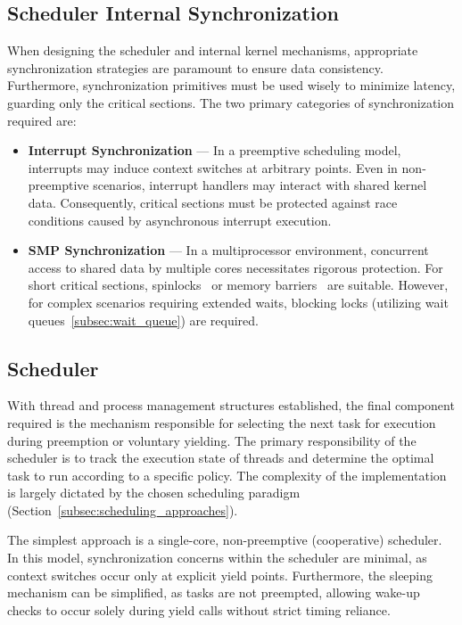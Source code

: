 \documentclass[a4paper,10pt,twoside]{report}
\theoremstyle{definition}
\begin{document}
\subsection{Scheduler Internal Synchronization}

When designing the scheduler and internal kernel mechanisms, appropriate synchronization strategies are paramount to ensure data consistency. Furthermore, synchronization primitives must be used wisely to minimize latency, guarding only the critical sections. The two primary categories of synchronization required are:

\begin{itemize}
\item \textbf{Interrupt Synchronization} --- In a preemptive scheduling model, interrupts may induce context switches at arbitrary points. Even in non-preemptive scenarios, interrupt handlers may interact with shared kernel data. Consequently, critical sections must be protected against race conditions caused by asynchronous interrupt execution.
\item \textbf{SMP Synchronization} --- In a multiprocessor environment, concurrent access to shared data by multiple cores necessitates rigorous protection. For short critical sections, spinlocks~\cite{spinlock} or memory barriers~\cite{barriers} are suitable. However, for complex scenarios requiring extended waits, blocking locks (utilizing wait queues~\ref{subsec:wait_queue}) are required.
\end{itemize}

\subsection{Scheduler}

With thread and process management structures established, the final component required is the mechanism responsible for selecting the next task for execution during preemption or voluntary yielding. The primary responsibility of the scheduler is to track the execution state of threads and determine the optimal task to run according to a specific policy. The complexity of the implementation is largely dictated by the chosen scheduling paradigm (Section~\ref{subsec:scheduling_approaches}).

The simplest approach is a single-core, non-preemptive (cooperative) scheduler. In this model, synchronization concerns within the scheduler are minimal, as context switches occur only at explicit yield points. Furthermore, the sleeping mechanism can be simplified, as tasks are not preempted, allowing wake-up checks to occur solely during yield calls without strict timing reliance.
\end{document}

